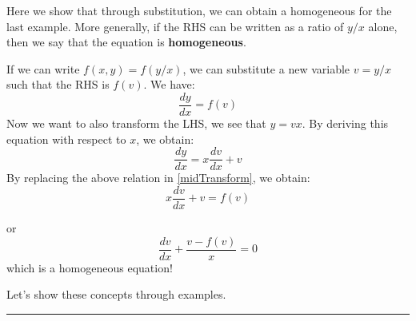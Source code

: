 Here we show that through substitution, we can obtain a homogeneous for the last example. More generally, if the RHS can be written as a ratio of $y/x$ alone, then we say that the equation is \textbf{homogeneous}.

If we can write $f(x,y)=f(y/x)$, we can substitute a new variable $v=y/x$ such that the RHS is $f(v)$. We have:
\begin{equation}
\frac{dy}{dx}=f(v)
\label{midTransform}
\end{equation}
Now we want to also transform the LHS, we see that $y=vx$. By deriving this equation with respect to $x$, we obtain:
\begin{equation}
\frac{dy}{dx}=x\frac{dv}{dx}+v
\end{equation}
By replacing the above relation in \eqref{midTransform}, we obtain:
\begin{equation}
x\frac{dv}{dx}+v = f(v)
\end{equation}

or 
\begin{equation}
\frac{dv}{dx}+\frac{v- f(v)}{x}=0
\end{equation}
which is a homogeneous equation!


Let's show these concepts through examples.
\begin{center}
\noindent\rule{4cm}{0.4pt}
\end{center}

